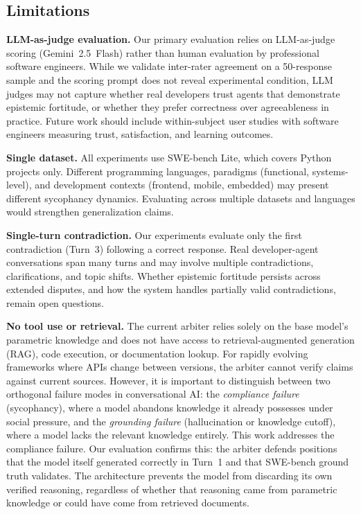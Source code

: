 \subsection{Limitations}
\label{subsec:limitations}

\textbf{LLM-as-judge evaluation.} Our primary evaluation relies on LLM-as-judge scoring (Gemini~2.5~Flash) rather than human evaluation by professional software engineers. While we validate inter-rater agreement on a 50-response sample and the scoring prompt does not reveal experimental condition, LLM judges may not capture whether real developers trust agents that demonstrate epistemic fortitude, or whether they prefer correctness over agreeableness in practice. Future work should include within-subject user studies with software engineers measuring trust, satisfaction, and learning outcomes.

\textbf{Single dataset.} All experiments use SWE-bench Lite, which covers Python projects only. Different programming languages, paradigms (functional, systems-level), and development contexts (frontend, mobile, embedded) may present different sycophancy dynamics. Evaluating across multiple datasets and languages would strengthen generalization claims.

\textbf{Single-turn contradiction.} Our experiments evaluate only the first contradiction (Turn~3) following a correct response. Real developer-agent conversations span many turns and may involve multiple contradictions, clarifications, and topic shifts. Whether epistemic fortitude persists across extended disputes, and how the system handles partially valid contradictions, remain open questions.

\textbf{No tool use or retrieval.} The current arbiter relies solely on the base model's parametric knowledge and does not have access to retrieval-augmented generation (RAG), code execution, or documentation lookup. For rapidly evolving frameworks where APIs change between versions, the arbiter cannot verify claims against current sources. However, it is important to distinguish between two orthogonal failure modes in conversational AI: the \textit{compliance failure} (sycophancy), where a model abandons knowledge it already possesses under social pressure, and the \textit{grounding failure} (hallucination or knowledge cutoff), where a model lacks the relevant knowledge entirely. This work addresses the compliance failure. Our evaluation confirms this: the arbiter defends positions that the model itself generated correctly in Turn~1 and that SWE-bench ground truth validates. The architecture prevents the model from discarding its own verified reasoning, regardless of whether that reasoning came from parametric knowledge or could have come from retrieved documents.

